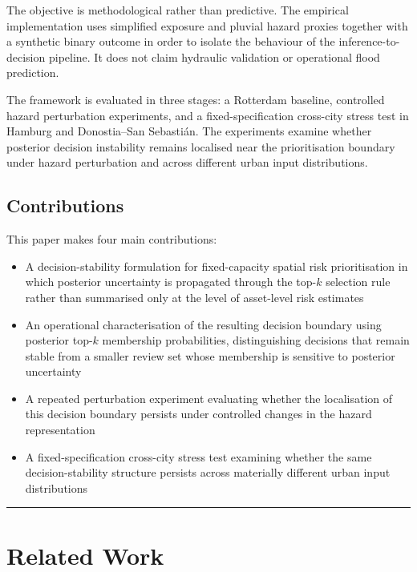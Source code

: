 \documentclass[
]{article}
\begin{document}
The objective is methodological rather than predictive. The empirical
implementation uses simplified exposure and pluvial hazard proxies
together with a synthetic binary outcome in order to isolate the
behaviour of the inference-to-decision pipeline. It does not claim
hydraulic validation or operational flood prediction.

The framework is evaluated in three stages: a Rotterdam baseline,
controlled hazard perturbation experiments, and a fixed-specification
cross-city stress test in Hamburg and Donostia--San Sebastián. The
experiments examine whether posterior decision instability remains
localised near the prioritisation boundary under hazard perturbation and
across different urban input distributions.

\subsection{Contributions}\label{contributions}

This paper makes four main contributions:

\begin{itemize}
\item
  A decision-stability formulation for fixed-capacity spatial risk
  prioritisation in which posterior uncertainty is propagated through
  the top-\(k\) selection rule rather than summarised only at the level
  of asset-level risk estimates
\item
  An operational characterisation of the resulting decision boundary
  using posterior top-\(k\) membership probabilities, distinguishing
  decisions that remain stable from a smaller review set whose
  membership is sensitive to posterior uncertainty
\item
  A repeated perturbation experiment evaluating whether the localisation
  of this decision boundary persists under controlled changes in the
  hazard representation
\item
  A fixed-specification cross-city stress test examining whether the
  same decision-stability structure persists across materially different
  urban input distributions
\end{itemize}

\begin{center}\rule{0.5\linewidth}{0.5pt}\end{center}

\section{Related Work}\label{related-work}
\end{document}
